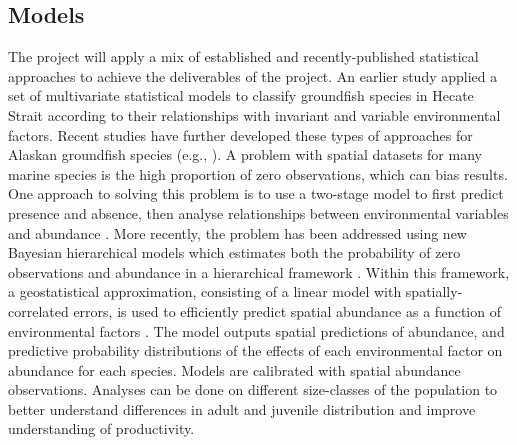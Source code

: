 \documentclass[11pt]{book}\usepackage[]{graphicx}\usepackage[]{color}
\newcommand{\rdata}{.RData}
\newcommand{\rfile}{example.r}
\newcommand{\rnwexamplefile}{example.Rnw}
\begin{document}
\subsection{Models}
The project will apply a mix of established and recently-published statistical approaches to achieve the deliverables of the project. An earlier study \citep{psf94} applied a set of multivariate statistical models to classify groundfish species in Hecate Strait according to their relationships with invariant and variable environmental factors. Recent studies have further developed these types of approaches for Alaskan groundfish species (e.g., \citet{roop05,roop08}). A problem with spatial datasets for many marine species is the high proportion of zero observations, which can bias results. One approach to solving this problem is to use a two-stage model to first predict presence and absence, then analyse relationships between environmental variables and abundance \citep{rm09}. More recently, the problem has been addressed using new Bayesian hierarchical models which estimates both the probability of zero observations and abundance in a hierarchical framework \citep{lec13, lec13b}. Within this framework, a geostatistical approximation, consisting of a linear model with spatially-correlated errors, is used to efficiently predict spatial abundance as a function of environmental factors \citep{lec13b}. The model outputs spatial predictions of abundance, and predictive probability distributions of the effects of each environmental factor on abundance for each species. 
Models are calibrated with spatial abundance observations. Analyses can be done on different size-classes of the population to better understand differences in adult and juvenile distribution and improve understanding of productivity. 

 

\end{document}
